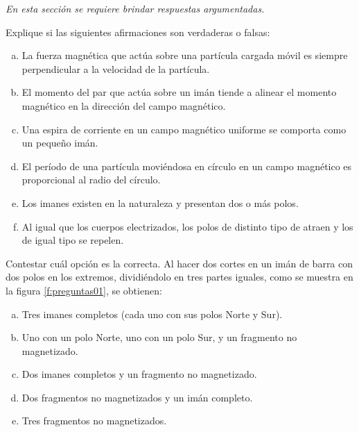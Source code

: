 \textit{En esta sección se requiere brindar respuestas argumentadas.}
\setcounter{figure}{0}
%
\begin{Exercise}
    Explique si las siguientes afirmaciones son verdaderas o falsas:
    \begin{enumerate}[a)]
        \item La fuerza magnética que actúa sobre una partícula cargada móvil es siempre perpendicular a la velocidad de la partícula.
        \item El momento del par que actúa sobre un imán tiende a alinear el momento magnético en la dirección del campo magnético.
        \item Una espira de corriente en un campo magnético uniforme se comporta como un pequeño imán.
        \item El período de una partícula moviéndosa en círculo en un campo magnético es proporcional al radio del círculo.
        \item Los imanes existen en la naturaleza y presentan dos o más polos.
        \item Al igual que los cuerpos electrizados, los polos de distinto tipo de atraen y los de igual tipo se repelen.
    \end{enumerate}
\end{Exercise}
%
\begin{Exercise}\label{p:preguntas01}
    Contestar cuál opción es la correcta. Al hacer dos cortes en un imán de barra con dos polos en los extremos, dividiéndolo en tres partes iguales, como se muestra en la figura \ref{f:preguntas01}, se obtienen:
    \begin{enumerate}[a)]
        \item Tres imanes completos (cada uno con sus polos Norte y Sur).
        \item Uno con un polo Norte, uno con un polo Sur, y un fragmento no magnetizado.
        \item Dos imanes completos y un fragmento no magnetizado.
        \item Dos fragmentos no magnetizados y un imán completo.
        \item Tres fragmentos no magnetizados.
    \end{enumerate}
\end{Exercise}
%
\begin{center}
\end{center}
